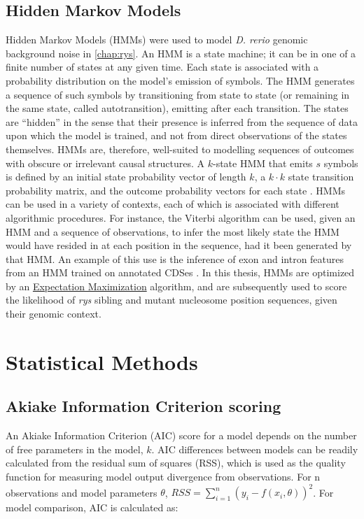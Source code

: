 \documentclass{ut-thesis}
\begin{document}
\begin{NoHyper}
\subsection{Hidden Markov Models}
\label{ssec:HMM}
Hidden Markov Models (HMMs) were used to model \textit{D. rerio} genomic background noise in \autoref{chap:rys}. An HMM is a state machine; it can be in one of a finite number of states at any given time. Each state is associated with a probability distribution on the model's emission of symbols. The HMM generates a sequence of such symbols by transitioning from state to state (or remaining in the same state, called autotransition), emitting after each transition. The states are ``hidden'' in the sense that their presence is inferred from the sequence of data upon which the model is trained, and not from direct observations of the states themselves. HMMs are, therefore, well-suited to modelling sequences of outcomes with obscure or irrelevant causal structures. A $k$-state HMM that emits $s$ symbols is defined by an initial state probability vector of length $k$, a $k\cdot k$ state transition probability matrix, and the outcome probability vectors for each state \cite{Rabiner1989}. HMMs can be used in a variety of contexts, each of which is associated with different algorithmic procedures. For instance, the Viterbi algorithm can be used, given an HMM and a sequence of observations, to infer the most likely state the HMM would have resided in at each position in the sequence, had it been generated by that HMM. An example of this use is the inference of exon and intron features from an HMM trained on annotated CDSes \cite{Henderson1997}. In this thesis, HMMs are optimized by an \hyperref[ssec:EM]{Expectation Maximization} algorithm, and are subsequently used to score the likelihood of \textit{rys} sibling and mutant nucleosome position sequences, given their genomic context.

\section{Statistical Methods}

\subsection{Akiake Information Criterion scoring}
\label{ssec:AIC}
An Akiake Information Criterion (AIC) score for a model depends on the number of free parameters in the model, $k$. AIC differences between models can be readily calculated from the residual sum of squares (RSS), which is used as the quality function for measuring model output divergence from observations. For n observations and model parameters $\theta$, $RSS = \sum_{i=1}^{n}(y_i-f(x_i,\theta))^2$. For model comparison, AIC is calculated as:


\end{NoHyper}
\end{document}

